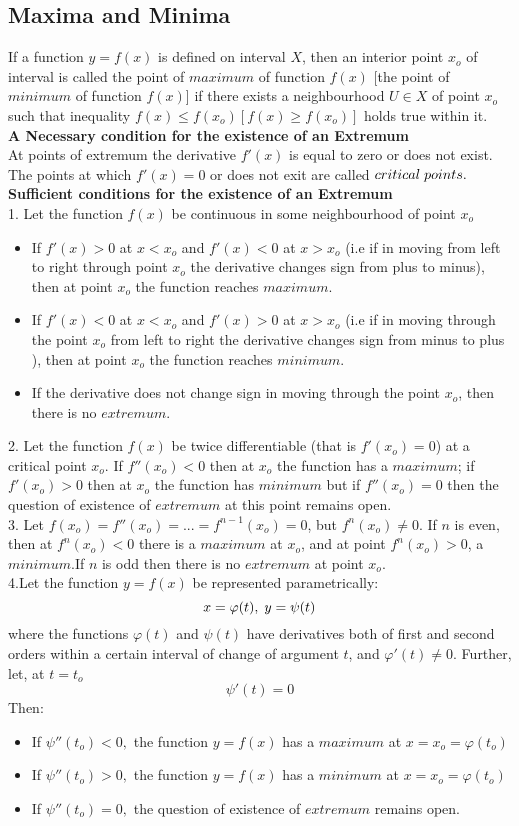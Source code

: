 \documentclass[twocolumn, 10pt]{article}
\begin{document}
\subsection{Maxima and Minima}
If a function $y=f(x)$ is defined on interval $X$, then an interior point $x_o$ of interval is called the point of $maximum$ of function $f(x)$ [the point of $minimum$ of function $f(x)$] if there exists a neighbourhood $U \in X$ of point $x_o$ such that inequality $f(x) \le f(x_o)[f(x) \ge f(x_o)]$ holds true within it.\\
\textbf{A Necessary condition for the existence of an  Extremum}\\ At points of extremum the derivative $f'(x)$ is equal to zero or does not exist. The points at which $f'(x)=0$ or does not exit are called $critical \thickspace points.$\\
\textbf{Sufficient conditions for the existence of an Extremum} \\
1. Let the function $f(x)$ be continuous in some neighbourhood of point $x_o$
\begin{itemize}
\item If $f'(x)>0$ at $x<x_o$ and $f'(x)<0$ at $x>x_o$ (i.e if in moving from left to right through point $x_o$ the derivative changes
sign from plus to minus), then at point $x_o$ the function reaches $maximum.$
\item If $f'(x)<0$ at $x<x_o$ and $f'(x)>0$ at $x>x_o$ (i.e if in moving through the point $x_o$ from left to right the derivative changes sign from minus to plus ), then at point $x_o$ the function reaches $minimum.$
\item If the derivative does not change sign in moving through the point $x_o$, then there is no $extremum.$
\end{itemize}
2. Let the function $f(x)$ be twice differentiable (that is $f'(x_o)=0$) at a critical point $x_o$. If $f''(x_o)<0$ then at $x_o$ the function has a $maximum$; if $f'(x_o)>0$ then at $x_o$ the function has $minimum$ but if $f''(x_o)=0$ then the question of existence of $extremum$ at this point remains open. \\
3. Let $f(x_o)=f''(x_o)=...=f^{n-1}(x_o)=0$, but $f^n(x_o) \not= 0$. If $n$ is even, then at $f^n(x_o)<0$ there is a $maximum$ at $x_o$, and at point $f^n(x_o)>0$, a $minimum$.If $n$ is odd then there is no $extremum$ at point $x_o$. \\
4.Let the function $y=f(x)$ be represented parametrically:
$$x=\varphi(t), \thickspace y=\psi(t)$$ where the functions $\varphi(t)$ and $\psi(t)$ have derivatives both of first and second orders within a certain interval of change of argument $t$, and $\varphi'(t) \not=0$. Further, let, at $t=t_o$
$$\psi'(t)=0$$
Then:
\begin{itemize}
\item If $\psi''(t_o)<0,$ the function $y=f(x)$ has a $maximum$ at $x=x_o=\varphi(t_o)$
\item If $\psi''(t_o)>0,$ the function $y=f(x)$ has a $minimum$ at $x=x_o=\varphi(t_o)$
\item If $\psi''(t_o)=0,$ the question of existence of $extremum$ remains open.
\end{itemize}
\end{document}
